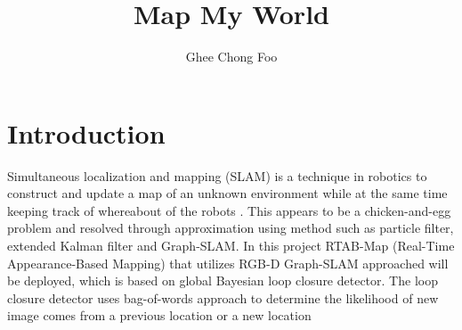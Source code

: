 \documentclass[10pt,journal,compsoc]{IEEEtran}
\begin{document}
\title{Map My World}

\author{Ghee Chong Foo}

%
{}


\maketitle
\IEEEdisplaynontitleabstractindextext
\IEEEpeerreviewmaketitle
\section{Introduction}
\label{sec:introduction}

\IEEEPARstart
{S}imultaneous localization and mapping (SLAM) is a technique in robotics to construct and update a map of an unknown environment while at the same time keeping track of whereabout of the robots \cite{SLAM}.  This appears to be a chicken-and-egg problem and resolved through approximation using method such as particle filter, extended Kalman filter and Graph-SLAM.  In this project RTAB-Map (Real-Time Appearance-Based Mapping) that utilizes RGB-D Graph-SLAM approached will be deployed, which is based on global Bayesian loop closure detector.  The loop closure detector uses bag-of-words approach to determine the likelihood of new image comes from a previous location or a new location \cite{RTAB-MAP}

\end{document}
